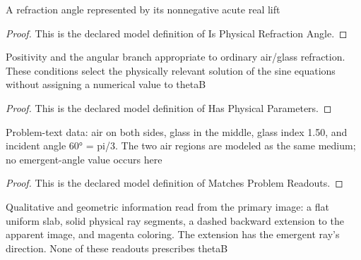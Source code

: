 \begin{definition}
  \label{def:physics:phyx-mini-0138:phyxminiproblems-problemphyxmini0138-isphysicalrefractionangle}
  A refraction angle represented by its nonnegative acute real lift
\end{definition}
\begin{proof}
  This is the declared model definition of Is Physical Refraction Angle.
\end{proof}
\begin{definition}
  \label{def:physics:phyx-mini-0138:phyxminiproblems-problemphyxmini0138-hasphysicalparameters}
  Positivity and the angular branch appropriate to ordinary air/glass refraction. These conditions select the physically relevant solution of the sine equations without assigning a numerical value to thetaB
\end{definition}
\begin{proof}
  This is the declared model definition of Has Physical Parameters.
\end{proof}
\begin{definition}
  \label{def:physics:phyx-mini-0138:phyxminiproblems-problemphyxmini0138-matchesproblemreadouts}
  Problem-text data: air on both sides, glass in the middle, glass index 1.50, and incident angle 60° = pi/3. The two air regions are modeled as the same medium; no emergent-angle value occurs here
\end{definition}
\begin{proof}
  This is the declared model definition of Matches Problem Readouts.
\end{proof}
\begin{definition}
  \label{def:physics:phyx-mini-0138:phyxminiproblems-problemphyxmini0138-matchessuppliedfigure}
  Qualitative and geometric information read from the primary image: a flat uniform slab, solid physical ray segments, a dashed backward extension to the apparent image, and magenta coloring. The extension has the emergent ray's direction. None of these readouts prescribes thetaB
\end{definition}

